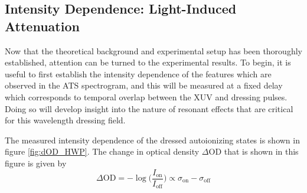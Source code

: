 \subsection{Intensity Dependence: Light-Induced Attenuation}
\label{sec:ATS_ar_LIA}

Now that the theoretical background and experimental setup has been thoroughly established, attention can be turned to the experimental results.  To begin, it is useful to first establish the intensity dependence of the features which are observed in the ATS spectrogram, and this will be measured at a fixed delay which corresponds to temporal overlap between the XUV and dressing pulses.  Doing so will develop insight into the nature of resonant effects that are critical for this wavelength dressing field.

The measured intensity dependence of the dressed autoionizing states is shown in figure \ref{fig:dOD_HWP}.  The change in optical density $\Delta\mathrm{OD}$ that is shown in this figure is given by
\begin{equation}
\label{eqn:OD_def}
	\Delta\mathrm{OD} = -\log\bigg(\frac{I_{\mathrm{on}}}{I_{\mathrm{off}}}\bigg) \propto \sigma_{\mathrm{on}} - \sigma_{\mathrm{off}}
\end{equation}
